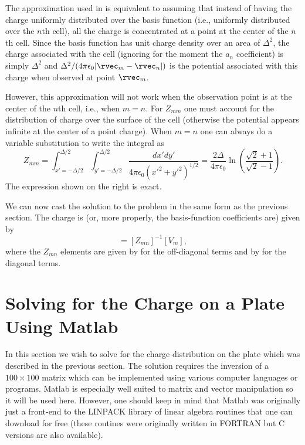 The approximation used in  is equivalent to
assuming that instead of having the charge uniformly distributed over
the basis function (i.e., uniformly distributed over the $n$th cell),
all the charge is concentrated at a point at the center of the $n$th
cell.  Since the basis function has unit charge density over an area
of $\Delta^2$, the charge associated with the cell (ignoring for the
moment the $a_n$ coefficient) is simply $\Delta^2$ and
$\Delta^2/(4\pi\epsilon_0|\rvec_m-\rvec_n|)$ is the potential associated
with this charge when observed at point $\rvec_m$.

However, this approximation will not work when the observation point
is at the center of the $n$th cell, i.e., when $m=n$.  For $Z_{mm}$
one must account for the distribution of charge over the surface of
the cell (otherwise the potential appears infinite at the center of a
point charge).  When $m=n$ one can always do a variable substitution
to write the integral as
\begin{equation}
  Z_{mm} = 
  \int_{x'=-\Delta/2}^{\Delta/2}\int_{y'=-\Delta/2}^{\Delta/2}
  \frac{dx'dy'}{4\pi\epsilon_0
    \left(x'^2 + y'^2\right)^{1/2}} =
   \frac{2\Delta}{4\pi\epsilon_0}
   \ln\!\left(\frac{\sqrt{2}+1}{\sqrt{2}-1}\right).
   \label{eq:zmm}
\end{equation}
The expression shown on the right is exact.

We can now cast the solution to the problem in the same form as the
previous section.  The charge is (or, more properly, the basis-function
coefficients are) given by
\begin{equation}
  [a_n] = [Z_{mn}]^{-1}[V_m],
\end{equation}
where the $Z_{mn}$ elements are given by  for the
off-diagonal terms and by  for the diagonal terms.

\section{Solving for the Charge on a Plate Using Matlab}

In this section we wish to solve for the charge distribution on the
plate which was described in the previous section.  The solution
requires the inversion of a $100\times 100$ matrix which can be
implemented using various computer languages or programs.  Matlab is
especially well suited to matrix and vector manipulation so it will be
used here.  However, one should keep in mind that Matlab was
originally just a front-end to the LINPACK library of linear algebra
routines that one can download for free (these routines were
originally written in FORTRAN but C versions are also available).

